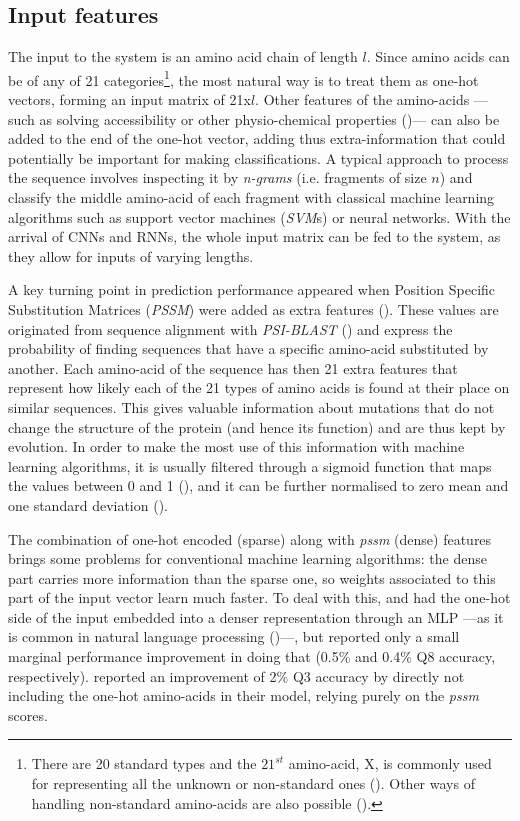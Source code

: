 \subsection{Input features}
The input to the system is an amino acid chain of length $l$. Since amino acids can be of any of 21 categories\footnote{There are 20 standard types and the $21^{st}$ amino-acid, X, is commonly used for representing all the unknown or non-standard ones (\cite{Zhou2018}). Other ways of handling non-standard amino-acids are also possible (\cite{Fang2017}).}, the most natural way is to treat them as one-hot vectors, forming an input matrix of 21x$l$. Other features of the amino-acids ---such as solving accessibility or other physio-chemical properties (\cite{Fauchere1988})--- can also be added to the end of the one-hot vector, adding thus extra-information that could potentially be important for making classifications. A typical approach to process the sequence involves inspecting it by \textit{n-grams} (i.e. fragments of size $n$) and classify the middle amino-acid of each fragment with classical machine learning algorithms such as support vector machines (\textit{SVM}s) or neural networks. With the arrival of CNNs and RNNs, the whole input matrix can be fed to the system, as they allow for inputs of varying lengths.

A key turning point in prediction performance appeared when Position Specific Substitution Matrices (\textit{PSSM}) were added as extra features (\cite{Yang2018}). These values are originated from sequence alignment with \textit{PSI-BLAST} (\cite{Altschul1997}) and express the probability of finding sequences that have a specific amino-acid substituted by another. Each amino-acid of the sequence has then 21 extra features that represent how likely each of the 21 types of amino acids is found at their place on similar sequences. This gives valuable information about mutations that do not change the structure of the protein (and hence its function) and are thus kept by evolution. In order to make the most use of this information with machine learning algorithms, it is usually filtered through a sigmoid function that maps the values between 0 and 1 (\cite{Jones1999}), and it can be further normalised to zero mean and one standard deviation (\cite{Busia2017}).

The combination of one-hot encoded (sparse) along with \textit{pssm} (dense) features brings some problems for conventional machine learning algorithms: the dense part carries more information than the sparse one, so weights associated to this part of the input vector learn much faster. To deal with this, \cite{Li2016} and \cite{Zhou2018} had the one-hot side of the input embedded into a denser representation through an MLP ---as it is common in natural language processing (\cite{Mesnil2015})---, but reported only a small marginal performance improvement in doing that (0.5\% and 0.4\% Q8 accuracy, respectively). \cite{Spencer2015} reported an improvement of 2\% Q3 accuracy by directly not including the one-hot amino-acids in their model, relying purely on the \textit{pssm} scores.

